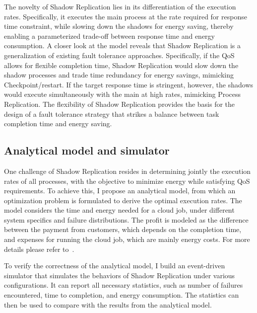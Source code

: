 The novelty of Shadow Replication lies in its differentiation of the execution rates. Specifically, it 
executes the main process at the rate required for response time constraint, while slowing down the shadows for energy saving, thereby enabling a parameterized trade-off between response time and energy consumption.
A closer look at the model reveals that Shadow
Replication is a generalization of existing fault tolerance
approaches. %
Specifically, if the
QoS allows for flexible completion time, Shadow
Replication would slow down the shadow processes and trade time
redundancy for energy savings, mimicking Checkpoint/restart. %
If the target response time is
stringent, however, %
the shadows would execute simultaneously with the main at high
rates, mimicking Process Replication. The flexibility of Shadow Replication provides the
basis for the design of a fault tolerance strategy that strikes a
balance between task completion time and energy saving.%

\subsection{Analytical model and simulator}

One challenge of Shadow Replication resides in determining
jointly the execution rates of all processes, %
with the objective to minimize energy while satisfying QoS requirements. To achieve this, I propose an analytical
model, from which an optimization problem is formulated to derive the optimal execution rates. The model considers the time and energy needed for a cloud job, %
under different system specifics and failure distributions. The profit is modeled as the difference between the payment from customers, which depends on the completion time, and expenses for running the cloud job, which are mainly energy costs. %
For more details please refer to~\cite{cui_en7085151}. 

To verify the correctness of the analytical model, I build an event-driven simulator that simulates the behaviors of Shadow Replication under various configurations. It can report all necessary statistics, such as number of failures encountered, time to completion, and energy consumption. The statistics can then be used to compare with the results from the analytical model.

